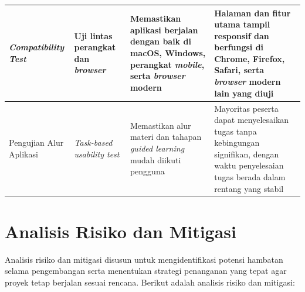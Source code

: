 \begin{longtable}{|p{3.2cm}|p{2cm}|p{3.5cm}|p{3.5cm}|}
\textit{Compatibility Test} &
Uji lintas perangkat dan \textit{browser} &
Memastikan aplikasi berjalan dengan baik di macOS, Windows, perangkat \textit{mobile}, serta \textit{browser} modern &
Halaman dan fitur utama tampil responsif dan berfungsi di Chrome, Firefox, Safari, serta \textit{browser} modern lain yang diuji \\
\hline

Pengujian Alur Aplikasi &
\textit{Task-based usability test} &
Memastikan alur materi dan tahapan \textit{guided learning} mudah diikuti pengguna &
Mayoritas peserta dapat menyelesaikan tugas tanpa kebingungan signifikan, dengan waktu penyelesaian tugas berada dalam rentang yang stabil \\
\hline

\end{longtable}



\section{Analisis Risiko dan Mitigasi}

Analisis risiko dan mitigasi disusun untuk mengidentifikasi potensi hambatan selama pengembangan serta menentukan strategi penanganan yang tepat agar proyek tetap berjalan sesuai rencana. Berikut adalah analisis risiko dan mitigasi:

